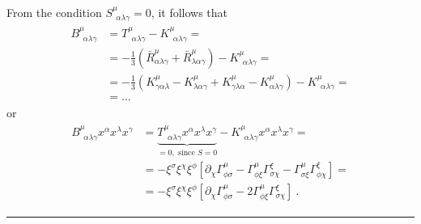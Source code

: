 \documentclass[letterpaper,10pt,english]{jupyterBook}
\begin{document}
\sphinxAtStartPar
From the condition \(S^{\mu}_{\ \ \alpha \lambda \gamma} = 0\), it follows that
\begin{equation*}
\begin{split}\begin{aligned}
  B^{\mu}_{\ \ \alpha \lambda \gamma} 
  & = T^{\mu}_{\ \ \alpha \lambda \gamma} - K^{\mu}_{\ \ \alpha \lambda \gamma} = \\
  & = - \frac{1}{3} \left( \bar{R}^{\mu}_{\alpha \lambda \gamma} + \bar{R}^{\mu}_{\lambda \alpha \gamma} \right) - K^{\mu}_{\ \ \alpha \lambda \gamma} = \\
  & = - \frac{1}{3} \left( K^{\mu}_{\gamma \alpha \lambda} - K^{\mu}_{\lambda \alpha \gamma} + K^{\mu}_{\gamma \lambda \alpha} - K^{\mu}_{\alpha \lambda \gamma} \right) - K^{\mu}_{\ \ \alpha \lambda \gamma} = \\
  & = \dots
\end{aligned}\end{split}
\end{equation*}
\sphinxAtStartPar
or
\begin{equation*}
\begin{split}\begin{aligned}
  B^{\mu}_{\ \ \alpha \lambda \gamma} x^{\alpha} x^{\lambda} x^{\gamma} 
  & = \underbrace{ T^{\mu}_{\ \ \alpha \lambda \gamma} x^{\alpha} x^{\lambda} x^{\gamma}}_{=0, \text{ since } S = 0} - K^{\mu}_{\ \ \alpha \lambda \gamma} x^{\alpha} x^{\lambda} x^{\gamma} = \\
  & = - \xi^{\sigma} \xi^{\chi} \xi^{\phi} \left[ \partial_{\chi} \Gamma^{\mu}_{\phi \sigma} - \Gamma^{\mu}_{\phi \xi} \Gamma^{\xi}_{\sigma \chi} - \Gamma^{\mu}_{\sigma \xi} \Gamma^{\xi}_{\phi \chi} \right] = \\
  & = - \xi^{\sigma} \xi^{\chi} \xi^{\phi} \left[ \partial_{\chi} \Gamma^{\mu}_{\phi \sigma} - 2 \Gamma^{\mu}_{\phi \xi} \Gamma^{\xi}_{\sigma \chi} \right] \ .
\end{aligned}\end{split}
\end{equation*}

\bigskip\hrule\bigskip
\end{document}
